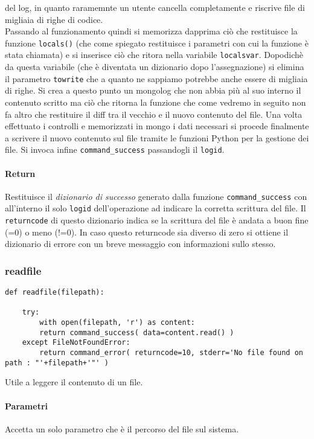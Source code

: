 \documentclass[11pt]{article}
\begin{document}
del log, in quanto raramemnte un utente cancella completamente e riscrive file di migliaia di righe di codice. \\
Passando al funzionamento quindi si memorizza dapprima ciò che restituisce la funzione \texttt{locals()} (che come spiegato
restituisce i parametri con cui la funzione è stata chiamata) e si inserisce ciò che ritora nella variabile \texttt{localsvar}.
Dopodichè da questa variabile (che è diventata un dizionario dopo l'assegnazione) si elimina il parametro \texttt{towrite}
che a quanto ne sappiamo potrebbe anche essere di migliaia di righe.
Si crea a questo punto un mongolog che non abbia più al suo interno il contenuto scritto ma ciò che ritorna la funzione
 che come vedremo in seguito non fa altro che restituire il diff tra il vecchio e il nuovo contenuto del file.
Una volta effettuato i controlli e memorizzati in mongo i dati necessari si procede finalmente a scrivere il nuovo contenuto sul file
tramite le funzioni Python per la gestione dei file. Si invoca infine \texttt{command\string_success} passandogli il \texttt{logid}.
\paragraph{Return}
Restituisce il \textit{dizionario di successo} generato dalla funzione \texttt{command\string_success} con all'interno
il solo \texttt{logid} dell'operazione ad indicare la corretta scrittura del file.
Il \texttt{returncode} di questo dizionario indica se la scrittura del file è andata a buon fine (=0) o meno (!=0).
In caso questo returncode sia diverso di zero si ottiene il dizionario di errore con un breve messaggio con informazioni
sullo stesso.

\subsubsection{readfile}\label{readfile}
\begin{lstlisting}
def readfile(filepath):

    try:
        with open(filepath, 'r') as content:
        return command_success( data=content.read() )
    except FileNotFoundError:
        return command_error( returncode=10, stderr='No file found on path : "'+filepath+'"' )

\end{lstlisting}
Utile a leggere il contenuto di un file.
\paragraph{Parametri}
Accetta un solo parametro che è il percorso del file sul sistema.
\end{document}
